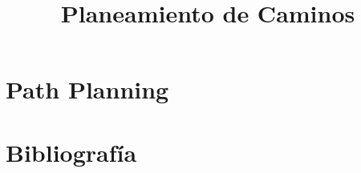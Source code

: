 \documentclass[aspectratio=169,compress]{beamer}
\title{Planeamiento de Caminos}
\author{}
\institute{Universidad Nacional de Rosario}
\date{}
\begin{document}
	
	\frame{\titlepage}
	
	\section{Path Planning}
	
	
	\section{Bibliografía}
	
	
\end{document}
